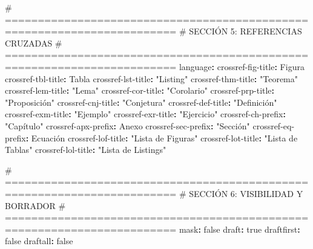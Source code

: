 \documentclass[
  doc,
  floatsintext,
  longtable,
  a4paper,
  nolmodern,
  notxfonts,
  notimes,
  12pt,
  colorlinks=true,linkcolor=blue,citecolor=blue,urlcolor=blue]{apa7}
\newenvironment{Shaded}{\begin{snugshade}}{\end{snugshade}}
\newcommand{\AttributeTok}[1]{\textcolor[rgb]{0.40,0.45,0.13}{#1}}
\newcommand{\CharTok}[1]{\textcolor[rgb]{0.13,0.47,0.30}{#1}}
\newcommand{\CommentTok}[1]{\textcolor[rgb]{0.37,0.37,0.37}{#1}}
\newcommand{\FunctionTok}[1]{\textcolor[rgb]{0.28,0.35,0.67}{#1}}
\newcommand{\KeywordTok}[1]{\textcolor[rgb]{0.00,0.23,0.31}{\textbf{#1}}}
\newcommand{\StringTok}[1]{\textcolor[rgb]{0.13,0.47,0.30}{#1}}
\begin{document}
\begin{Shaded}
\begin{Highlighting}[]
\CommentTok{\# ========================================================================}
\CommentTok{\# SECCIÓN 5: REFERENCIAS CRUZADAS}
\CommentTok{\# ========================================================================}
\FunctionTok{language}\KeywordTok{:}
\AttributeTok{  }\FunctionTok{crossref{-}fig{-}title}\KeywordTok{:}\AttributeTok{ Figura}
\AttributeTok{  }\FunctionTok{crossref{-}tbl{-}title}\KeywordTok{:}\AttributeTok{ Tabla}
\AttributeTok{  }\FunctionTok{crossref{-}lst{-}title}\KeywordTok{:}\AttributeTok{ }\StringTok{"Listing"}
\AttributeTok{  }\FunctionTok{crossref{-}thm{-}title}\KeywordTok{:}\AttributeTok{ }\StringTok{"Teorema"}
\AttributeTok{  }\FunctionTok{crossref{-}lem{-}title}\KeywordTok{:}\AttributeTok{ }\StringTok{"Lema"}
\AttributeTok{  }\FunctionTok{crossref{-}cor{-}title}\KeywordTok{:}\AttributeTok{ }\StringTok{"Corolario"}
\AttributeTok{  }\FunctionTok{crossref{-}prp{-}title}\KeywordTok{:}\AttributeTok{ }\StringTok{"Proposición"}
\AttributeTok{  }\FunctionTok{crossref{-}cnj{-}title}\KeywordTok{:}\AttributeTok{ }\StringTok{"Conjetura"}
\AttributeTok{  }\FunctionTok{crossref{-}def{-}title}\KeywordTok{:}\AttributeTok{ }\StringTok{"Definición"}
\AttributeTok{  }\FunctionTok{crossref{-}exm{-}title}\KeywordTok{:}\AttributeTok{ }\StringTok{"Ejemplo"}
\AttributeTok{  }\FunctionTok{crossref{-}exr{-}title}\KeywordTok{:}\AttributeTok{ }\StringTok{"Ejercicio"}
\AttributeTok{  }\FunctionTok{crossref{-}ch{-}prefix}\KeywordTok{:}\AttributeTok{ }\StringTok{"Capítulo"}
\AttributeTok{  }\FunctionTok{crossref{-}apx{-}prefix}\KeywordTok{:}\AttributeTok{ Anexo}
\AttributeTok{  }\FunctionTok{crossref{-}sec{-}prefix}\KeywordTok{:}\AttributeTok{ }\StringTok{"Sección"}
\AttributeTok{  }\FunctionTok{crossref{-}eq{-}prefix}\KeywordTok{:}\AttributeTok{ Ecuación}
\AttributeTok{  }\FunctionTok{crossref{-}lof{-}title}\KeywordTok{:}\AttributeTok{ }\StringTok{"Lista de Figuras"}
\AttributeTok{  }\FunctionTok{crossref{-}lot{-}title}\KeywordTok{:}\AttributeTok{ }\StringTok{"Lista de Tablas"}
\AttributeTok{  }\FunctionTok{crossref{-}lol{-}title}\KeywordTok{:}\AttributeTok{ }\StringTok{"Lista de Listings"}

\CommentTok{\# ========================================================================}
\CommentTok{\# SECCIÓN 6: VISIBILIDAD Y BORRADOR}
\CommentTok{\# ========================================================================}
\FunctionTok{mask}\KeywordTok{:}\AttributeTok{ }\CharTok{false}
\FunctionTok{draft}\KeywordTok{:}\AttributeTok{ }\CharTok{true}
\FunctionTok{draftfirst}\KeywordTok{:}\AttributeTok{ }\CharTok{false}
\FunctionTok{draftall}\KeywordTok{:}\AttributeTok{ }\CharTok{false}


\end{Highlighting}
\end{Shaded}
\end{document}
